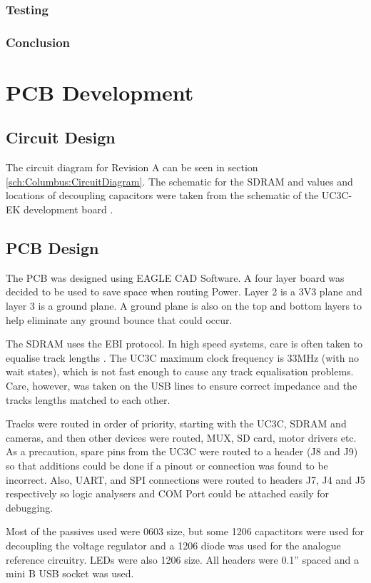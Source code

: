 \subsubsection{Testing}\label{Section:MotorTest}
\subsubsection{Conclusion}

\section{PCB Development}
\subsection{Circuit Design}
The circuit diagram for Revision A can be seen in section \ref{sch:Columbus:CircuitDiagram}. The schematic for the SDRAM and values and locations of decoupling capacitors were taken from the schematic of the UC3C-EK development board \citep{Atmel:UC3CEK}. 
\subsection{PCB Design}
The PCB was designed using EAGLE CAD Software. A four layer board was decided to be used to save space when routing Power. Layer 2 is a 3V3 plane and layer 3 is a ground plane. A ground plane is also on the top and bottom layers to help eliminate any ground bounce that could occur. 

The SDRAM uses the EBI protocol. In high speed systems, care is often taken to equalise track lengths \citep{liu2004equalization}. The UC3C maximum clock frequency is 33MHz (with no wait states), which is not fast enough to cause any track equalisation problems. Care, however, was taken on the USB lines to ensure correct impedance and the tracks lengths matched to each other.

Tracks were routed in order of priority, starting with the UC3C, SDRAM and cameras, and then other devices were routed, \itc MUX, SD card, motor drivers etc. As a precaution, spare pins from the UC3C were routed to a header (J8 and J9) so that additions could be done if a pinout or connection was found to be incorrect. Also, UART, \itc and SPI connections were routed to headers J7, J4 and J5 respectively so logic analysers and COM Port could be attached easily for debugging.

Most of the passives used were 0603 size, but some 1206 capactitors were used for decoupling the voltage regulator and a 1206 diode was used for the analogue reference circuitry. LEDs were also 1206 size. All headers were 0.1'' spaced and a mini B USB socket was used. 

